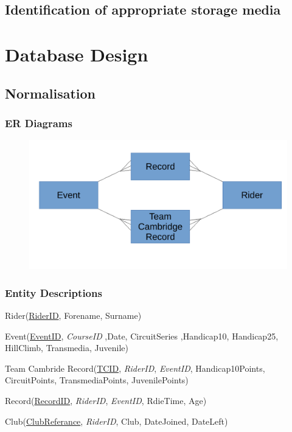 \subsection{Identification of appropriate storage media}

\section{Database Design}

\subsection{Normalisation}

\subsubsection{ER Diagrams}
\begin{figure}[H]
    \includegraphics[width=\textwidth]{./ER/ERDesing.pdf}
\end{figure}

\subsubsection{Entity Descriptions}

Rider(\underline{RiderID}, Forename, Surname)

Event(\underline{EventID}, \emph{CourseID} ,Date, CircuitSeries ,Handicap10, Handicap25, HillClimb, Transmedia, Juvenile)

Team Cambride Record(\underline{TCID}, \emph{RiderID}, \emph{EventID}, Handicap10Points, CircuitPoints, TransmediaPoints, JuvenilePoints)

Record(\underline{RecordID}, \emph{RiderID}, \emph{EventID}, RdieTime, Age)

Club(\underline{ClubReferance}, \emph{RiderID}, Club, DateJoined, DateLeft)

